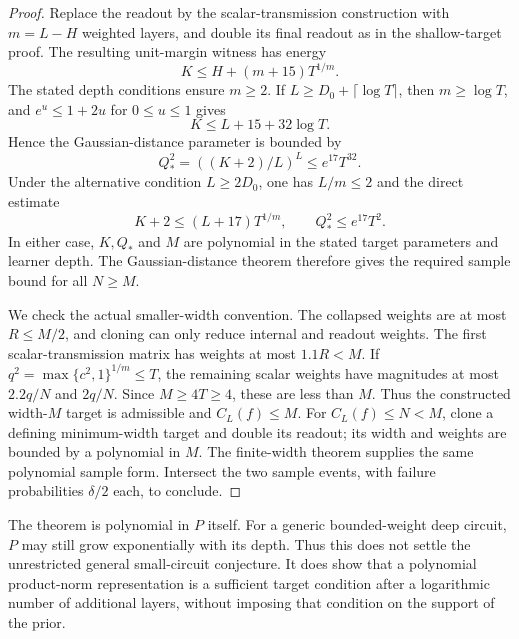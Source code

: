 \begin{proof}
Replace the readout by the scalar-transmission construction with
$m=L-H$ weighted layers, and double its final readout as in the
shallow-target proof. The resulting unit-margin witness has energy
\[
 K\le H+(m+15)T^{1/m}.
\]
The stated depth conditions ensure $m\ge2$.
If $L\ge D_0+\lceil\log T\rceil$, then $m\ge\log T$, and
$e^u\le1+2u$ for $0\le u\le1$ gives
\[
 K\le L+15+32\log T.
\]
Hence the Gaussian-distance parameter is bounded by
\[
 Q_*^2=((K+2)/L)^L\le e^{17}T^{32}.
\]
Under the alternative condition $L\ge2D_0$, one has $L/m\le2$ and
the direct estimate
\[
 K+2\le(L+17)T^{1/m},\qquad Q_*^2\le e^{17}T^2.
\]
In either case, $K,Q_*$ and $M$ are polynomial in the stated target
parameters and learner depth. The Gaussian-distance theorem therefore
gives the required sample bound for all $N\ge M$.

We check the actual smaller-width convention. The collapsed weights
are at most $R\le M/2$, and cloning can only reduce internal and
readout weights. The first scalar-transmission matrix has weights at
most $1.1R<M$. If $q^2=\max\{c^2,1\}^{1/m}\le T$, the remaining
scalar weights have magnitudes at most $2.2q/N$ and $2q/N$.
Since $M\ge4T\ge4$, these are less than $M$.
Thus the constructed width-$M$ target is admissible and $C_L(f)\le M$.
For $C_L(f)\le N<M$, clone a defining minimum-width target and double
its readout; its width and weights are bounded by a polynomial in $M$.
The finite-width theorem supplies the same polynomial sample form.
Intersect the two sample events, with failure probabilities $\delta/2$
each, to conclude.
\end{proof}

The theorem is polynomial in $P$ itself. For a generic bounded-weight
deep circuit, $P$ may still grow exponentially with its depth. Thus this
does not settle the unrestricted general small-circuit conjecture.
It does show that a polynomial product-norm representation is a
sufficient target condition after a logarithmic number of additional
layers, without imposing that condition on the support of the prior.
